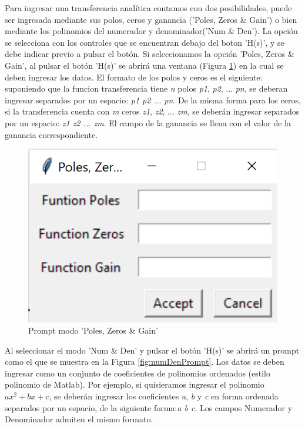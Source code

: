 Para ingresar una transferencia analítica contamos con dos posibilidades, puede ser ingresada mediante sus polos, ceros y ganancia ('Poles, Zeros \& Gain') o bien mediante los polinomios del numerador y denominador('Num \& Den'). La opción se selecciona con los controles que se encuentran debajo del boton 'H(s)', y se debe indicar previo a pulsar el botón. 
Si seleccionamos la opción 'Poles, Zeros \& Gain', al pulsar el botón 'H(s)' se abrirá una ventana (Figura \ref{fig:pzgPromt}) en la cual se deben ingresar los datos. El formato de los polos y ceros es el siguiente: suponiendo que la funcion transferencia tiene \emph{n} polos \emph{p1}, \emph{p2}, ... \emph{pn}, se deberan ingresar separados por un espacio: \emph{p1 p2 ... pn}. De la misma forma para los ceros, si la transferencia cuenta con \emph{m} ceros \emph{z1}, \emph{z2}, ... \emph{zm}, se deberán ingresar separados por un espacio: \emph{z1 z2 ... zm}. El campo de la ganancia se llena con el valor de la ganancia correspondiente.

\begin{figure}[ht]
\centering
\includegraphics[scale=0.3]{resources/pzgPrompt.png}
\caption{Prompt modo 'Poles, Zeros \& Gain'}
\label{fig:pzgPromt}
\end{figure}

Al seleccionar el modo 'Num \& Den' y pulsar el botón 'H(s)' se abrirá un prompt como el que se muestra en la Figura \ref{fig:numDenPrompt}. Los datos se deben ingresar como un conjunto de coeficientes de polinomios ordenados (estilo polinomio de Matlab). Por ejemplo, si quisieramos ingresar el polinomio $ax^2 + bx + c$, se deberán ingresar los coeficientes \emph{a}, \emph{b} y \emph{c} en forma ordenada separados por un espacio, de la siguiente forma:\emph{a b c}. Los campos Numerador y Denominador admiten el mismo formato.

